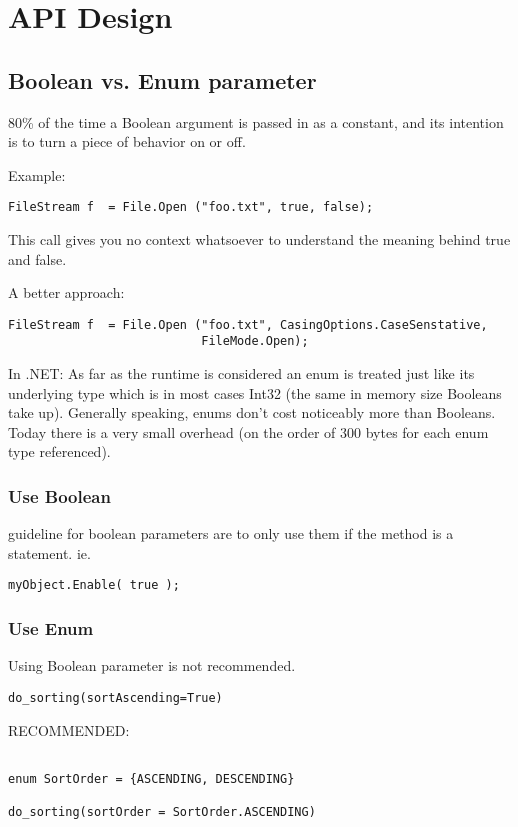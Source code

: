 \chapter{API Design}

\section{Boolean vs. Enum parameter}

80\% of the time a Boolean argument is passed in as a constant, and its
intention is to turn a piece of behavior on or off. 

Example: 
\begin{verbatim}
FileStream f  = File.Open ("foo.txt", true, false);
\end{verbatim}
This call gives you no context whatsoever to understand the meaning behind true
and false. 

A better approach:
\begin{verbatim}
FileStream f  = File.Open ("foo.txt", CasingOptions.CaseSenstative,
                           FileMode.Open);
\end{verbatim}


In .NET: As far as the runtime is considered an enum is treated just like its
underlying type which is in most cases Int32 (the same in memory size Booleans
take up). Generally speaking, enums don't cost noticeably more than Booleans.  
Today there is a very small overhead (on the order of 300 bytes for each enum
type referenced).

\subsection{Use Boolean}

guideline for boolean parameters are to only use them if the method is a
statement. ie. 
\begin{verbatim}
myObject.Enable( true ); 
\end{verbatim}

\subsection{Use Enum}

 Using Boolean parameter is not recommended.
\begin{verbatim}
do_sorting(sortAscending=True)
\end{verbatim}

RECOMMENDED:
\begin{verbatim}

enum SortOrder = {ASCENDING, DESCENDING}

do_sorting(sortOrder = SortOrder.ASCENDING)
\end{verbatim}


